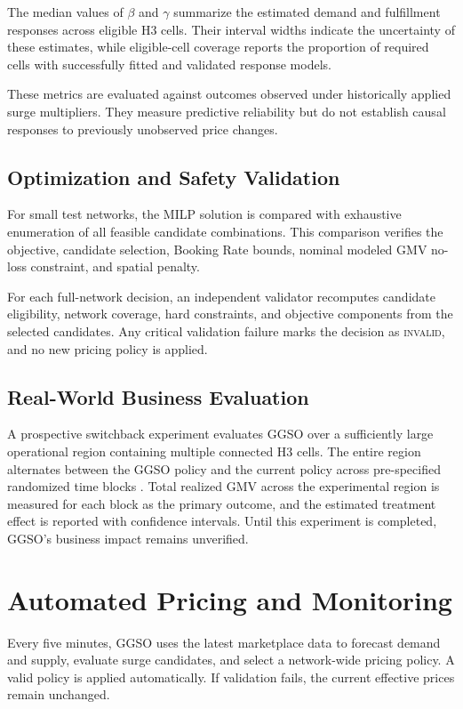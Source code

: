 \documentclass[a4paper,10pt,twocolumn]{article}
\newcommand{\INVALID}{\textsc{invalid}}
\begin{document}
The median values of $\beta$ and $\gamma$ summarize the estimated demand and
fulfillment responses across eligible H3 cells. Their interval widths indicate
the uncertainty of these estimates, while eligible-cell coverage reports the
proportion of required cells with successfully fitted and validated response
models.

These metrics are evaluated against outcomes observed under historically
applied surge multipliers. They measure predictive reliability but do not
establish causal responses to previously unobserved price changes.


\subsection{Optimization and Safety Validation}
For small test networks, the MILP solution is compared with exhaustive
enumeration of all feasible candidate combinations. This comparison verifies
the objective, candidate selection, Booking Rate bounds, nominal modeled GMV
no-loss constraint, and spatial penalty.

For each full-network decision, an independent validator recomputes candidate
eligibility, network coverage, hard constraints, and objective components from
the selected candidates. Any critical validation failure marks the decision
as \INVALID, and no new pricing policy is applied.

\subsection{Real-World Business Evaluation}
A prospective switchback experiment evaluates GGSO over a sufficiently large
operational region containing multiple connected H3 cells. The entire region
alternates between the GGSO policy and the current policy across pre-specified
randomized time blocks \cite{bojinov2023}. Total realized GMV across the
experimental region is measured for each block as the primary outcome, and the
estimated treatment effect is reported with confidence intervals. Until this
experiment is completed, GGSO's business impact remains unverified.

\section{Automated Pricing and Monitoring}

Every five minutes, GGSO uses the latest marketplace data to forecast demand
and supply, evaluate surge candidates, and select a network-wide pricing policy.
A valid policy is applied automatically. If validation fails, the current
effective prices remain unchanged.
\end{document}
